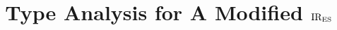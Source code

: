 \documentclass[10pt,conference]{IEEEtran}
\begin{document}
\title{Type Analysis for A Modified ${\text{IR}_\text{ES}}$}

\author{}
% 
% 

\maketitle




\end{document}
